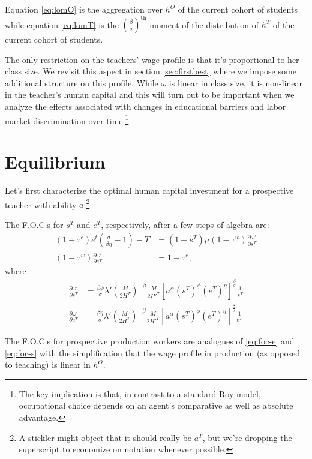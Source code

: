 \documentclass[onehalfspacing,11pt]{article}
\begin{document}
Equation \eqref{eq:lomO} is the aggregation over $h^O$ of the current cohort of students while equation \eqref{eq:lomT} is the ${\left( \tfrac{\beta}{\sigma} \right)}^{\textrm{th}}$ moment of the distribution of $h^T$ of the current cohort of students.

The only restriction on the teachers' wage profile is that it's proportional to her class size. We revisit this aspect in section \ref{sec:firstbest} where we impose some additional structure on this profile. While $\omega$ is linear in class size, it is non-linear in the teacher's human capital and this will turn out to be important when we analyze the effects associated with changes in educational barriers and labor market discrimination over time.\footnote{The key implication is that, in contrast to a standard Roy model, occupational choice depends on an agent's comparative as well as absolute advantage.}

\section{Equilibrium}
Let's first characterize the optimal human capital investment for a prospective teacher with ability $a$.\footnote{A stickler might object that it should really be $a^T$, but we're dropping the superscript to economize on notation whenever possible.}

The F.O.C.s for $s^T$ and $e^T$, respectively, after a few steps of algebra are:
\begin{align}
\label{eq:foc-e}
(1-\tau^e) e^t \left( \frac{\sigma}{\beta \eta}-1 \right) - T & = \left(1-s^T\right) \mu(1-\tau^w) \frac{\partial \omega'}{\partial s^T} \\
\label{eq:foc-s}
(1-\tau^w) \frac{\partial \omega'}{\partial e^T} & = 1-\tau^e,
\end{align}
where
\begin{align}
 \frac{\partial \omega'}{\partial s^T} & =  \frac{\beta \phi}{\sigma} \lambda' \left(\frac{M}{2 H^T}\right)^{-\beta} \frac{M}{2 {{H'}^T}} \left[ a^\alpha (s^T)^\phi (e^T)^\eta \right]^{\frac{\beta}{\sigma}} \frac{1}{s^T} \label{eq:sT} \\
 \frac{\partial \omega'}{\partial e^T} & = \frac{\beta \eta}{\sigma} \lambda' \left(\frac{M}{2 H^T}\right)^{-\beta} \frac{M}{2 {{H'}^T}} \left[ a^\alpha (s^T)^\phi (e^T)^\eta \right]^{\frac{\beta}{\sigma}} \frac{1}{e^T} \label{eq:eT}
\end{align}

The F.O.C.s for prospective production workers are analogues of \eqref{eq:foc-e} and \eqref{eq:foc-s} with the simplification that the wage profile in production (as opposed to teaching) is linear in $h^O$.
\end{document}
